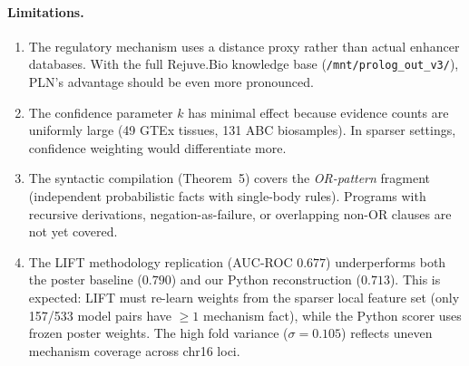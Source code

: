 \documentclass[]{article}
\newcommand{\code}[1]{\texttt{#1}}
\begin{document}
\paragraph{Limitations.}
\begin{enumerate}
\item The regulatory mechanism uses a distance proxy rather than actual enhancer
  databases.  With the full Rejuve.Bio knowledge base (\code{/mnt/prolog\_out\_v3/}),
  PLN's advantage should be even more pronounced.
\item The confidence parameter $k$ has minimal effect because evidence counts are
  uniformly large (49 GTEx tissues, 131 ABC biosamples).  In sparser settings,
  confidence weighting would differentiate more.
\item The syntactic compilation (Theorem~5) covers the \emph{OR-pattern} fragment
  (independent probabilistic facts with single-body rules).  Programs with recursive
  derivations, negation-as-failure, or overlapping non-OR clauses are not yet covered.
\item The LIFT methodology replication (AUC-ROC $0.677$) underperforms both the
  poster baseline ($0.790$) and our Python reconstruction ($0.713$).  This is
  expected: LIFT must re-learn weights from the sparser local feature set (only
  157/533 model pairs have $\geq 1$ mechanism fact), while the Python scorer uses
  frozen poster weights.  The high fold variance ($\sigma = 0.105$) reflects
  uneven mechanism coverage across chr16 loci.
\end{enumerate}
\end{document}
